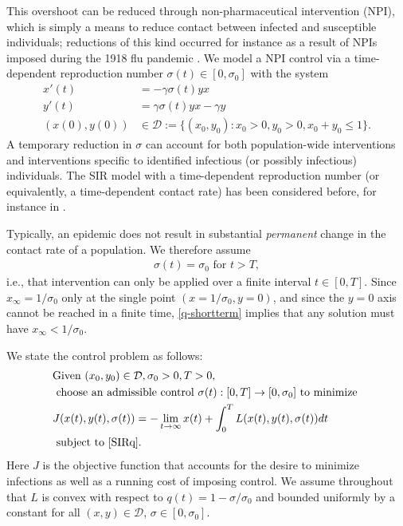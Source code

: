 \documentclass[english,12pt,letter]{article}
\newcommand{\Rnot}{\sigma_0}
\newcommand{\dom}{{\mathcal D}}
\begin{document}
This overshoot can be reduced through non-pharmaceutical intervention (NPI),
which is simply a means to reduce contact between infected and susceptible
individuals; reductions of this kind occurred for instance as a result
of NPIs imposed during the 1918 flu pandemic \cite{bootsma2007effect}.  We model a NPI
control via a time-dependent reproduction number $\sigma(t)\in[0,\Rnot]$ with the system
\begin{subequations} \label{SIRq}
\begin{align}
    x'(t) & = -\gamma \sigma(t) y x \\
    y'(t) & = \gamma \sigma(t) y x - \gamma y \\
    (x(0),y(0)) & \in \dom := \{(x_0,y_0) : x_0 > 0, y_0 > 0, x_0+y_0 \le 1\}.
\end{align}
\end{subequations}
A temporary reduction in $\sigma$ can account for both
population-wide interventions and interventions specific to identified infectious
(or possibly infectious) individuals.  The SIR model with a time-dependent
reproduction number (or equivalently, a time-dependent contact rate) has been 
considered before, for instance in \cite{bootsma2007effect,sun2020tracking}.

Typically, an epidemic does not result in substantial {\em permanent} change in the contact rate of
a population.  We therefore assume 
\begin{align} \label{q-shortterm}
    \sigma(t)=\Rnot \text{ for } t>T,
\end{align}
i.e., that intervention can only be applied over a finite interval $t \in [0,T]$.
Since $x_\infty=1/\sigma_0$ only at the single point $(x=1/\sigma_0,y=0)$, and since 
the $y=0$ axis cannot be reached in a finite time, \eqref{q-shortterm} implies
that any solution must have $x_\infty<1/\sigma_0$.

We state the control problem as follows:
\begin{align} \label{eq:inf-time-problem}
\begin{aligned}
& \text{Given } (x_0, y_0)\in\dom, \sigma_0>0, T>0,  \\
& \text{ choose an admissible control } \sigma(t): [0,T] \to [0,\Rnot] \text{ to minimize }  \\
&     J(x(t),y(t),\sigma(t)) = -\lim_{t\to\infty} x(t) + \int_0^T L(x(t),y(t),\sigma(t)) dt \\
& \text{ subject to } \eqref{SIRq}.
\end{aligned}
\end{align}
Here $J$ is the objective function that accounts for the desire to
minimize infections as well as a running cost of imposing control.
We assume throughout that $L$ is convex with respect to $q(t)=1-\sigma/\Rnot$ and
bounded uniformly by a constant for all $(x,y)\in \dom$, $\sigma\in[0,\sigma_0]$.
\end{document}
